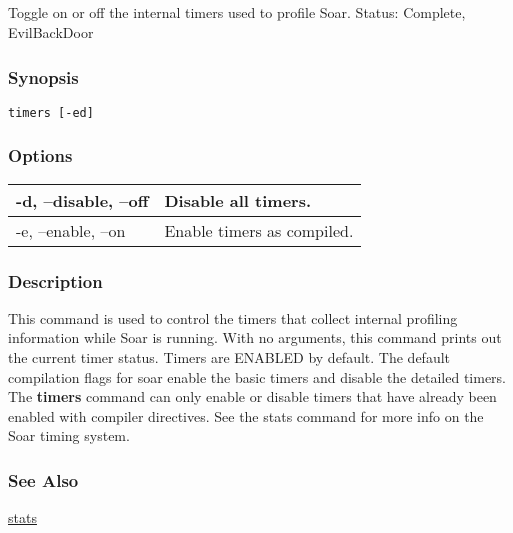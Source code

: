 \subsection{}
\label{timers}
Toggle on or off the internal timers used to profile Soar. 
 Status: Complete, EvilBackDoor
\subsubsection*{Synopsis}
\begin{verbatim}
timers [-ed]
\end{verbatim}
\subsubsection*{Options}
\begin{tabular}{|l|l|}
\hline 
 -d, --disable, --off  & Disable all timers.  \\
 \hline 
 -e, --enable, --on  & Enable timers as compiled.  \\
 \hline 
\end{tabular}
\subsubsection*{Description}
 This command is used to control the timers that collect internal profiling information while Soar is running. With no arguments, this command prints out the current timer status. Timers are ENABLED by default. The default compilation flags for soar enable the basic timers and disable the detailed timers. The \textbf{timers}
 command can only enable or disable timers that have already been enabled with compiler directives. See the stats command for more info on the Soar timing system. 
\subsubsection*{See Also}
\hyperref[stats]{stats} 